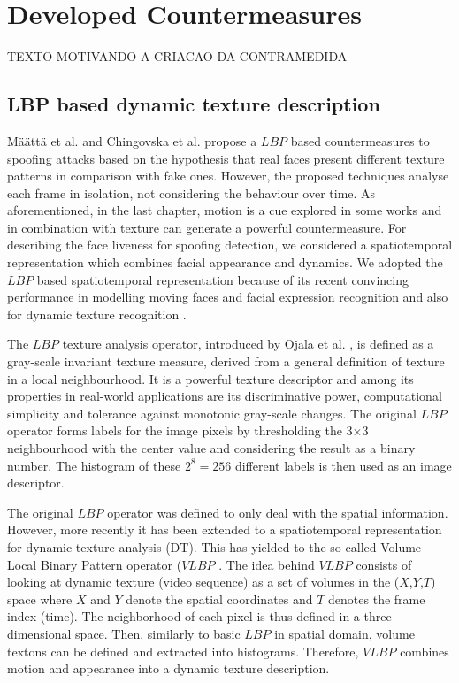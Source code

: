 \chapter{Developed Countermeasures}
\label{chap:Proposed_Countermeasures}

TEXTO MOTIVANDO A CRIACAO DA CONTRAMEDIDA

\section{LBP based dynamic texture description}
\label{sec_dynamic}

M\"{a}\"{a}tt\"{a} et al. \cite{maatta2011face} and Chingovska et al. \cite{ChingovskaBIOSIG2012} propose a $LBP$ based countermeasures to spoofing attacks based on the hypothesis that real faces  present different texture patterns in comparison with fake ones. However, the proposed techniques analyse each frame in isolation, not considering the behaviour over time. As aforementioned, in the last chapter, motion is a cue explored in some works and in combination with texture can generate a powerful countermeasure. For describing the face liveness for spoofing detection, we considered a spatiotemporal representation which combines facial appearance and dynamics. We adopted the $LBP$ based spatiotemporal representation because of its recent convincing performance in modelling moving faces and facial expression recognition and also for dynamic texture recognition \cite{pietikainen2011computer}. 

The $LBP$ texture analysis operator, introduced by Ojala et al. \cite{hadid:62,hadid:39}, is defined as a gray-scale invariant  texture measure, derived from a general definition of texture in a local neighbourhood. It is a powerful texture descriptor and among its properties in real-world applications are its discriminative power, computational simplicity and tolerance against monotonic gray-scale changes. The original $LBP$ operator forms labels for the image pixels by thresholding the 3$\times$3 neighbourhood with the center value and considering the result as a binary number. The histogram of these $2^8=256$ different labels is then used as an image descriptor.

The original $LBP$ operator was defined to only deal with the spatial information. However, more recently it has been extended to a spatiotemporal representation for dynamic texture analysis (DT). This has yielded to the so called Volume Local Binary Pattern operator ($VLBP$ \cite{zhao2007dynamic}. The idea behind $VLBP$ consists of looking at dynamic texture (video sequence) as a set of volumes in the ($X$,$Y$,$T$) space where $X$ and $Y$ denote the spatial coordinates and $T$ denotes the frame index (time). The neighborhood of each pixel is thus defined in a three dimensional space. Then, similarly to basic $LBP$ in spatial domain, volume textons can be defined and extracted into histograms. Therefore, $VLBP$ combines motion and appearance into a dynamic texture description.

